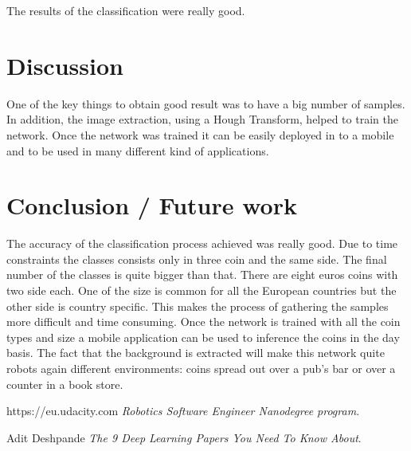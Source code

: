 \documentclass[10pt,journal,compsoc]{IEEEtran}
\begin{document}
The results of the classification were really good. 

\section{Discussion}

One of the key things to obtain good result was to have a big number of samples. In addition, the image extraction, using a Hough Transform, helped to train the network. Once the network was trained it can be easily deployed in to a mobile and to be used in many different kind of applications.

	
\section{Conclusion / Future work}

The accuracy of the classification process achieved was really good. Due to time constraints the classes consists only in three coin and the same side. The final number of the classes is quite bigger than that. There are eight euros coins with two side each. One of the size is common for all the European countries but the other side is country specific. This makes the process of gathering the samples more difficult and time consuming. Once the network is trained with all the coin types and size a mobile application can be used to inference the coins in the day basis. The fact that the background is extracted will make this network quite robots again different environments: coins spread out over a pub's bar or over a counter in a book store.


\begin{thebibliography}{9}


https://eu.udacity.com
\textit{Robotics Software Engineer Nanodegree program}. 

Adit Deshpande
\textit{The 9 Deep Learning Papers You Need To Know About}. 

\end{thebibliography}
		
\end{document}
